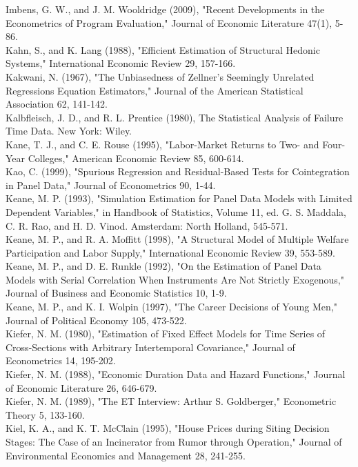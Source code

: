 \documentclass[10pt]{article}
\begin{document}
Imbens, G. W., and J. M. Wooldridge (2009), "Recent Developments in the Econometrics of Program Evaluation," Journal of Economic Literature 47(1), 5-86.\\
Kahn, S., and K. Lang (1988), "Efficient Estimation of Structural Hedonic Systems," International Economic Review 29, 157-166.\\
Kakwani, N. (1967), "The Unbiasedness of Zellner's Seemingly Unrelated Regressions Equation Estimators," Journal of the American Statistical Association 62, 141-142.\\
Kalbfleisch, J. D., and R. L. Prentice (1980), The Statistical Analysis of Failure Time Data. New York: Wiley.\\
Kane, T. J., and C. E. Rouse (1995), "Labor-Market Returns to Two- and Four-Year Colleges," American Economic Review 85, 600-614.\\
Kao, C. (1999), "Spurious Regression and Residual-Based Tests for Cointegration in Panel Data," Journal of Econometrics 90, 1-44.\\
Keane, M. P. (1993), "Simulation Estimation for Panel Data Models with Limited Dependent Variables," in Handbook of Statistics, Volume 11, ed. G. S. Maddala, C. R. Rao, and H. D. Vinod. Amsterdam: North Holland, 545-571.\\
Keane, M. P., and R. A. Moffitt (1998), "A Structural Model of Multiple Welfare Participation and Labor Supply," International Economic Review 39, 553-589.\\
Keane, M. P., and D. E. Runkle (1992), "On the Estimation of Panel Data Models with Serial Correlation When Instruments Are Not Strictly Exogenous," Journal of Business and Economic Statistics 10, 1-9.\\
Keane, M. P., and K. I. Wolpin (1997), "The Career Decisions of Young Men," Journal of Political Economy 105, 473-522.\\
Kiefer, N. M. (1980), "Estimation of Fixed Effect Models for Time Series of Cross-Sections with Arbitrary Intertemporal Covariance," Journal of Econometrics 14, 195-202.\\
Kiefer, N. M. (1988), "Economic Duration Data and Hazard Functions," Journal of Economic Literature 26, 646-679.\\
Kiefer, N. M. (1989), "The ET Interview: Arthur S. Goldberger," Econometric Theory 5, 133-160.\\
Kiel, K. A., and K. T. McClain (1995), "House Prices during Siting Decision Stages: The Case of an Incinerator from Rumor through Operation," Journal of Environmental Economics and Management 28, 241-255.\\
\end{document}
